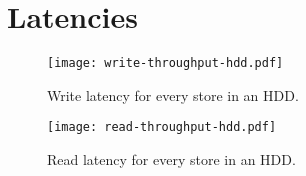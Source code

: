 \section{Latencies}

\begin{figure}[h]
    \centering
    \texttt{[image: write-throughput-hdd.pdf]}
    \caption{Write latency for every store in an HDD.}
    \label{fig:write-throughput-hdd}
\end{figure}

\begin{figure}[h]
    \centering
    \texttt{[image: read-throughput-hdd.pdf]}
    \caption{Read latency for every store in an HDD.}
    \label{fig:}
\end{figure}
